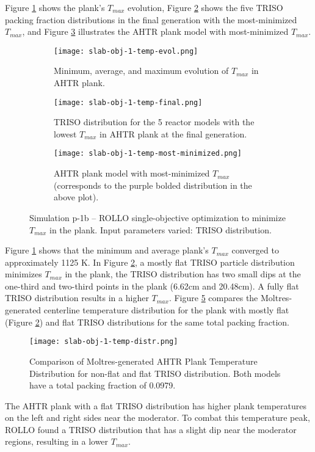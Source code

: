 Figure \ref{fig:slab-obj-1-temp-evol} shows the plank's $T_{max}$ evolution, Figure 
\ref{fig:slab-obj-1-temp-final} shows the five \gls{TRISO} packing fraction
distributions in the final generation with the most-minimized $T_{max}$, and 
Figure \ref{fig:slab-obj-1-temp-most-minimized} illustrates the \gls{AHTR} plank model 
with most-minimized $T_{max}$. 
\begin{figure}[htbp!]
    \centering
    \begin{subfigure}{0.95\textwidth}
        \texttt{[image: slab-obj-1-temp-evol.png]}
        \caption{Minimum, average, and maximum evolution of $T_{max}$ in 
        AHTR plank.}
        \label{fig:slab-obj-1-temp-evol} 
    \end{subfigure}
    \begin{subfigure}{0.95\textwidth}
        \texttt{[image: slab-obj-1-temp-final.png]}
        \caption{TRISO distribution for the 5 reactor models with the 
        lowest $T_{max}$ in AHTR plank at the final generation.}
        \label{fig:slab-obj-1-temp-final} 
    \end{subfigure}
    \begin{subfigure}{0.95\textwidth}
        \texttt{[image: slab-obj-1-temp-most-minimized.png]}
        \caption{\gls{AHTR} plank model with most-minimized $T_{max}$
        (corresponds to the purple bolded distribution in the above plot).}
        \label{fig:slab-obj-1-temp-most-minimized} 
    \end{subfigure}
    \caption{Simulation p-1b -- ROLLO single-objective optimization to minimize $T_{max}$ 
    in the plank. Input parameters varied: TRISO distribution.}
    \label{fig:slab-obj-1-temp}
\end{figure}

Figure \ref{fig:slab-obj-1-temp-evol} shows that the minimum and average plank's 
$T_{max}$ converged to approximately 1125 K. 
In Figure \ref{fig:slab-obj-1-temp-final}, a mostly flat TRISO 
particle distribution minimizes $T_{max}$ in the plank, the TRISO distribution 
has two small dips at the one-third and two-third points in the plank (6.62cm and 20.48cm). 
A fully flat \gls{TRISO} distribution results in a higher $T_{max}$.
Figure \ref{fig:slab-obj-1-temp-distr} compares the Moltres-generated centerline 
temperature distribution for the plank with mostly flat (Figure 
\ref{fig:slab-obj-1-temp-final}) and flat TRISO distributions for the same 
total packing fraction.
\begin{figure}[htbp!]
    \centering
    \texttt{[image: slab-obj-1-temp-distr.png]}
    \caption{Comparison of Moltres-generated AHTR Plank Temperature Distribution for non-flat and flat
    TRISO distribution. Both models have a total packing fraction of 0.0979.}
    \label{fig:slab-obj-1-temp-distr}
\end{figure}
The \gls{AHTR} plank with a flat \gls{TRISO} distribution has higher plank temperatures 
on the left and right sides near the moderator. 
To combat this temperature peak, ROLLO found a \gls{TRISO} distribution that 
has a slight dip near the moderator regions, resulting in a lower $T_{max}$.

